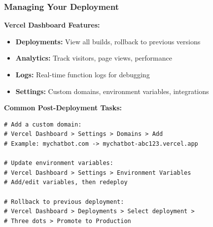 \begin{frame}[fragile]\frametitle{Managing Your Deployment}
\textbf{Vercel Dashboard Features:}
  \begin{itemize}
    \item \textbf{Deployments:} View all builds, rollback to previous versions
    \item \textbf{Analytics:} Track visitors, page views, performance
    \item \textbf{Logs:} Real-time function logs for debugging
    \item \textbf{Settings:} Custom domains, environment variables, integrations
  \end{itemize}

\textbf{Common Post-Deployment Tasks:}

\begin{lstlisting}
# Add a custom domain:
# Vercel Dashboard > Settings > Domains > Add
# Example: mychatbot.com -> mychatbot-abc123.vercel.app

# Update environment variables:
# Vercel Dashboard > Settings > Environment Variables
# Add/edit variables, then redeploy

# Rollback to previous deployment:
# Vercel Dashboard > Deployments > Select deployment > 
# Three dots > Promote to Production
\end{lstlisting}
\end{frame}



